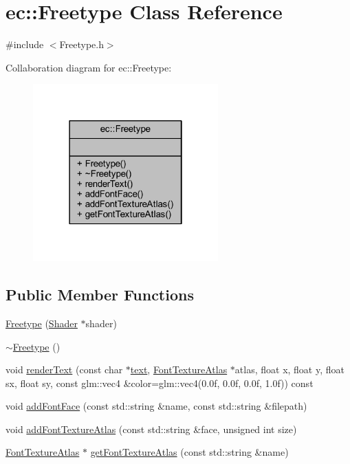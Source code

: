 \hypertarget{classec_1_1_freetype}{}\section{ec\+:\+:Freetype Class Reference}
\label{classec_1_1_freetype}


{\ttfamily \#include $<$Freetype.\+h$>$}



Collaboration diagram for ec\+:\+:Freetype\+:\nopagebreak
\begin{figure}[H]
\begin{center}
\leavevmode
\includegraphics[width=202pt]{classec_1_1_freetype__coll__graph}
\end{center}
\end{figure}
\subsection*{Public Member Functions}
\begin{DoxyCompactItemize}
\item 
\mbox{\hyperlink{classec_1_1_freetype_a77da5cdd8b053a5fea7c5ffd78c39418}{Freetype}} (\mbox{\hyperlink{classec_1_1_shader}{Shader}} $\ast$shader)
\item 
\mbox{\hyperlink{classec_1_1_freetype_a35e8fad09705600cdd263ed3781d299b}{$\sim$\+Freetype}} ()
\item 
void \mbox{\hyperlink{classec_1_1_freetype_afef1f61fa4bd8114825c66ac93d3e6bf}{render\+Text}} (const char $\ast$\mbox{\hyperlink{namespaceec_a5de6bdb8c4b2ed6e590e721ec998f964a1cb251ec0d568de6a929b520c4aed8d1}{text}}, \mbox{\hyperlink{classec_1_1_font_texture_atlas}{Font\+Texture\+Atlas}} $\ast$atlas, float x, float y, float sx, float sy, const glm\+::vec4 \&color=glm\+::vec4(0.\+0f, 0.\+0f, 0.\+0f, 1.\+0f)) const
\item 
void \mbox{\hyperlink{classec_1_1_freetype_a7a10e5515342b70588f76328ac83826d}{add\+Font\+Face}} (const std\+::string \&name, const std\+::string \&filepath)
\item 
void \mbox{\hyperlink{classec_1_1_freetype_a1be4b69e2d57689533ddaabdc9042d51}{add\+Font\+Texture\+Atlas}} (const std\+::string \&face, unsigned int size)
\item 
\mbox{\hyperlink{classec_1_1_font_texture_atlas}{Font\+Texture\+Atlas}} $\ast$ \mbox{\hyperlink{classec_1_1_freetype_a3e0a8937ec0ceb33495598da59b2c4f3}{get\+Font\+Texture\+Atlas}} (const std\+::string \&name)
\end{DoxyCompactItemize}


